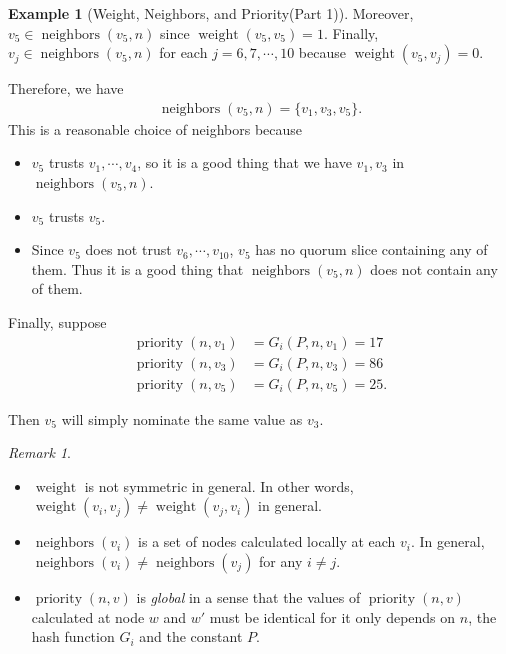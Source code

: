 \documentclass[12pt, psamsfonts]{amsart}
\theoremstyle{definition}
\newtheorem{exmp}[thm]{Example}
\theoremstyle{remark}
\newtheorem{rem}[thm]{Remark}
\DeclareMathOperator{\weight}{weight}
\DeclareMathOperator{\neighbors}{neighbors}
\DeclareMathOperator{\priority}{priority}
\numberwithin{equation}{subsection}
\begin{document}
\begin{exmp}[Weight, Neighbors, and Priority(Part 1)]
    Moreover, $v_5 \in \neighbors(v_5, n)$ since $\weight(v_5, v_5) = 1$.
    Finally, $v_j \in \neighbors(v_5, n)$ for each $j = 6, 7, \cdots, 10$ because $\weight(v_5, v_j) = 0$.

    Therefore, we have
    \begin{align*}
        \neighbors(v_5, n) = \{ v_1, v_3, v_5 \}.
    \end{align*}
    This is a reasonable choice of neighbors because
    \begin{itemize}
        \item
            $v_5$ trusts $v_1, \cdots, v_4$, so it is a good thing that we have $v_1, v_3$ in $\neighbors(v_5, n)$.
        \item
            $v_5$ trusts $v_5$.
        \item
            Since $v_5$ does not trust $v_6, \cdots, v_{10}$, $v_5$ has no quorum slice containing any of them.
            Thus it is a good thing that $\neighbors(v_5, n)$ does not contain any of them.
    \end{itemize}

    Finally, suppose
    \begin{align*}
        \priority(n, v_1) &= G_i(P, n, v_1) = 17 \\
        \priority(n, v_3) &= G_i(P, n, v_3) = 86 \\
        \priority(n, v_5) &= G_i(P, n, v_5) = 25.
    \end{align*}

    Then $v_5$ will simply nominate the same value as $v_3$.
\end{exmp}

\begin{rem}
    $ $
    \begin{itemize}
        \item
            $\weight$ is not symmetric in general.
            In other words, $\weight(v_i, v_j) \ne \weight(v_j, v_i)$ in general.
        \item
            $\neighbors(v_i)$ is a set of nodes calculated locally at each $v_i$.
            In general, $\neighbors(v_i) \ne \neighbors(v_j)$ for any $i \ne j$.
        \item
            $\priority(n, v)$ is \textit{global} in a sense that the values of $\priority(n, v)$ calculated at node $w$ and $w'$ must be identical for it only depends on $n$, the hash function $G_i$ and the constant $P$.
    \end{itemize}
\end{rem}
\end{document}
